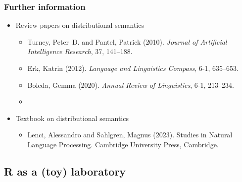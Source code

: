 \documentclass[t]{beamer} %
\begin{document}
\begin{frame}
  \frametitle{Further information}

  \begin{itemize}

  \item Review papers on distributional semantics
    \begin{itemize}
    \item\nocite{Turney:Pantel:10}
      Turney, Peter~D. and Pantel, Patrick (2010).
      {\em Journal of Artificial Intelligence Research},  37, 141--188.%
    \item\nocite{Erk:12}
      Erk, Katrin (2012).
      {\em Language and Linguistics Compass},  6-1, 635--653.%
    \item\nocite{Boleda:20}
      Boleda, Gemma (2020).
      {\em Annual Review of Linguistics},  6-1, 213--234.%
    \item[]
    \end{itemize}

  \item Textbook on distributional semantics
    \begin{itemize}
    \item\nocite{Lenci:Sahlgren:23}
      Lenci, Alessandro and Sahlgren, Magnus (2023).
      Studies in Natural Language Processing. Cambridge University Press, Cambridge.
    \end{itemize}
  \end{itemize}

\end{frame}

\subsection{R as a (toy) laboratory}
\end{document}
